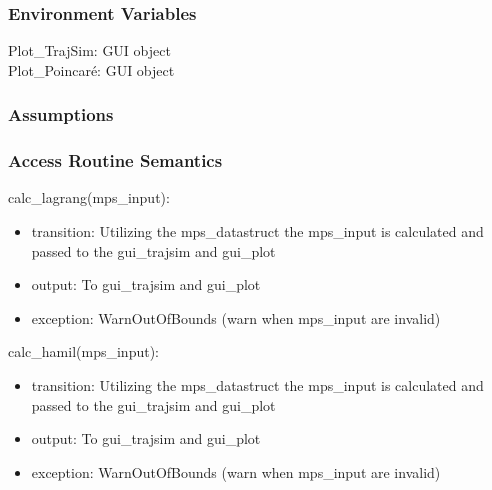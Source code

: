 \documentclass[12pt, titlepage]{article}
\begin{document}
\subsubsection{Environment Variables}

\noindent Plot{\_}TrajSim: GUI object\\
Plot{\_}Poincar\'{e}: GUI object\\



\subsubsection{Assumptions}


\subsubsection{Access Routine Semantics}

\noindent calc\_lagrang(mps\_input):
\begin{itemize}
\item transition: Utilizing the mps\_datastruct the mps\_input is calculated 
and passed to the gui\_trajsim and gui\_plot  
\item output: To gui\_trajsim and gui\_plot  
\item exception: WarnOutOfBounds (warn when mps\_input are invalid) 
\end{itemize}

\noindent calc\_hamil(mps\_input):
\begin{itemize}
\item transition: Utilizing the mps\_datastruct the mps\_input is calculated 
and passed to the gui\_trajsim and gui\_plot  
\item output: To gui\_trajsim and gui\_plot  
\item exception: WarnOutOfBounds (warn when mps\_input are invalid) 
\end{itemize}
\end{document}
